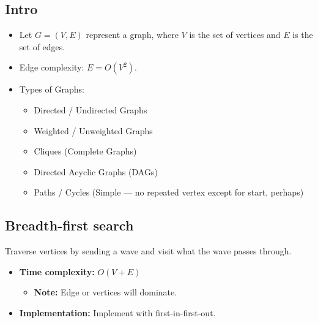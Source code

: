 \subsection{Intro}
\begin{summary}
    \begin{itemize}
        \item Let \( G = (V, E) \) represent a graph, where \( V \) is the set of vertices and \( E \) is the set of edges.
        \item Edge complexity: \( E = O(V^2) \).
        \item Types of Graphs:
        \begin{itemize}
            \item Directed / Undirected Graphs
            \item Weighted / Unweighted Graphs
            \item Cliques (Complete Graphs)
            \item Directed Acyclic Graphs (DAGs)
            \item Paths / Cycles (Simple — no repeated vertex except for start, perhaps)
        \end{itemize}
    \end{itemize}
\end{summary}

\subsection{Breadth-first search}
\begin{definition}
    Traverse vertices by sending a wave and visit what the wave passes through. 
    \begin{itemize}
        \item \textbf{Time complexity:} $O(V + E)$
        \begin{itemize}
            \item \textbf{Note:} Edge or vertices will dominate.
        \end{itemize}
        \item \textbf{Implementation:} Implement with first-in-first-out.
    \end{itemize}
\end{definition}

\begin{example}
\end{example}

